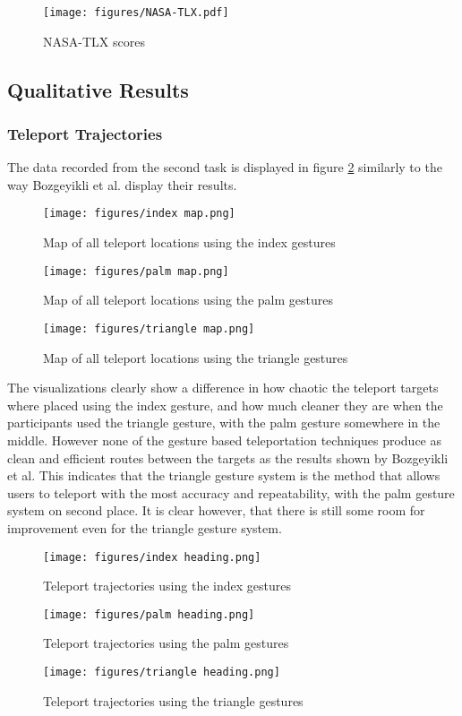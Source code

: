 \begin{figure}[!ht]
    \centering
    \texttt{[image: figures/NASA-TLX.pdf]}
    \caption{NASA-TLX scores}
    \label{fig:ueqDependability}
\end{figure}


\subsection{Qualitative Results}

\subsubsection{Teleport Trajectories}
The data recorded from the second task is displayed in figure \ref{fig:exp2maps} similarly to the way Bozgeyikli et al. %
display their results. 

\begin{figure}[!htb]
        \texttt{[image: figures/index map.png]}
        \caption{Map of all teleport locations using the index gestures}\label{fig:map_index}
    \endminipage\hfill
        \texttt{[image: figures/palm map.png]}
        \caption{Map of all teleport locations using the palm gestures}\label{fig:map_palm}
    \endminipage\hfill
        \texttt{[image: figures/triangle map.png]}
        \caption{Map of all teleport locations using the triangle gestures}\label{fig:map_triangle}
        \label{fig:exp2maps}
    \endminipage
\end{figure}
    
The visualizations clearly show a difference in how chaotic the teleport targets where placed using the index gesture, and how much cleaner they are when the participants used the triangle gesture, with the palm gesture somewhere in the middle. However none of the gesture based teleportation techniques produce as clean and efficient routes between the targets as the results shown by Bozgeyikli et al. This indicates that the triangle gesture system is the method that allows users to teleport with the most accuracy and repeatability, with the palm gesture system on second place. It is clear however, that there is still some room for improvement even for the triangle gesture system. 

\begin{figure}[!htb]
        \texttt{[image: figures/index heading.png]}
        \caption{Teleport trajectories using the index gestures}\label{fig:map_index2}
    \endminipage\hfill
        \texttt{[image: figures/palm heading.png]}
        \caption{Teleport trajectories using the palm gestures}\label{fig:map_palm2}
    \endminipage\hfill
        \texttt{[image: figures/triangle heading.png]}
        \caption{Teleport trajectories using the triangle gestures}\label{fig:map_triangle2}
    \endminipage
\end{figure}

